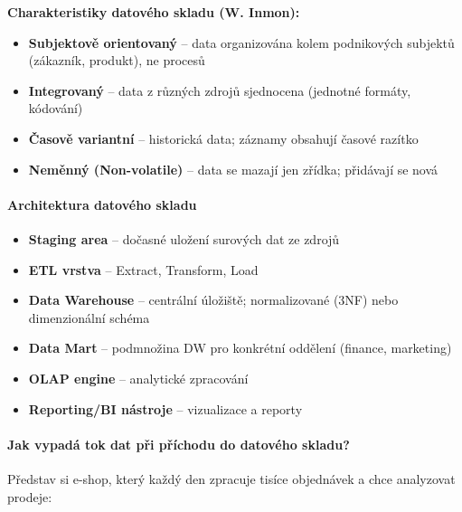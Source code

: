 \textbf{Charakteristiky datového skladu (W. Inmon):}
\begin{itemize}
  \item \textbf{Subjektově orientovaný} -- data organizována kolem podnikových subjektů (zákazník, produkt), ne procesů
  \item \textbf{Integrovaný} -- data z různých zdrojů sjednocena (jednotné formáty, kódování)
  \item \textbf{Časově variantní} -- historická data; záznamy obsahují časové razítko
  \item \textbf{Neměnný (Non-volatile)} -- data se mazají jen zřídka; přidávají se nová
\end{itemize}

\paragraph{Architektura datového skladu}
\begin{itemize}
  \item \textbf{Staging area} -- dočasné uložení surových dat ze zdrojů
  \item \textbf{ETL vrstva} -- Extract, Transform, Load
  \item \textbf{Data Warehouse} -- centrální úložiště; normalizované (3NF) nebo dimenzionální schéma
  \item \textbf{Data Mart} -- podmnožina DW pro konkrétní oddělení (finance, marketing)
  \item \textbf{OLAP engine} -- analytické zpracování
  \item \textbf{Reporting/BI nástroje} -- vizualizace a reporty
\end{itemize}

\paragraph{Jak vypadá tok dat při příchodu do datového skladu?}

Představ si e-shop, který každý den zpracuje tisíce objednávek a chce analyzovat prodeje:

